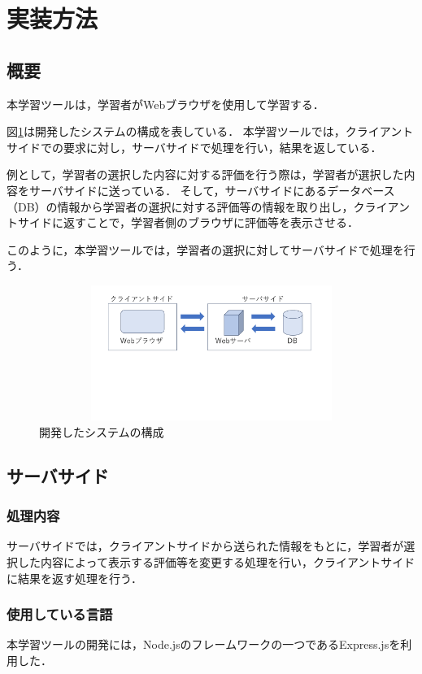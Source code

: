 \section{実装方法}

\subsection{概要}
本学習ツールは，学習者がWebブラウザを使用して学習する．

図\ref{fig:sa-ba}は開発したシステムの構成を表している．
本学習ツールでは，クライアントサイドでの要求に対し，サーバサイドで処理を行い，結果を返している．

例として，学習者の選択した内容に対する評価を行う際は，学習者が選択した内容をサーバサイドに送っている．
そして，サーバサイドにあるデータベース（DB）の情報から学習者の選択に対する評価等の情報を取り出し，クライアントサイドに返すことで，学習者側のブラウザに評価等を表示させる．

このように，本学習ツールでは，学習者の選択に対してサーバサイドで処理を行う．

\begin{figure}[h]
\begin{center}
 \includegraphics[clip,width=160mm,height=44mm]{images/sa-ba.pdf}
\end{center}
 \caption{開発したシステムの構成}
 \label{fig:sa-ba}
\end{figure}


\subsection{サーバサイド}
\subsubsection{処理内容}
サーバサイドでは，クライアントサイドから送られた情報をもとに，学習者が選択した内容によって表示する評価等を変更する処理を行い，クライアントサイドに結果を返す処理を行う．

\subsubsection{使用している言語}
本学習ツールの開発には，Node.jsのフレームワークの一つであるExpress.jsを利用した．

